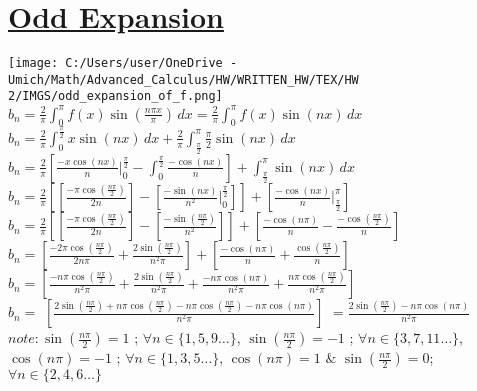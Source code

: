 \documentclass[a4paper,man,natbib]{apa6}
\begin{document}
\section{\underline{Odd Expansion}}
\label{sec: Odd Expansion}
\begin{center} 

    \texttt{[image: C:/Users/user/OneDrive - Umich/Math/Advanced\_Calculus/HW/WRITTEN\_HW/TEX/HW 2/IMGS/odd\_expansion\_of\_f.png]} \\
   
    \hfill \break
    $ b_n = \frac{2}{\pi}  \int_{0}^{\pi} f(x) \sin(\frac{n\pi x}{\pi}) \,dx  =
    \frac{2}{\pi}  \int_{0}^{\pi} f(x) \sin(nx) \,dx $ \\ 
    $ b_n = \frac{2}{\pi}  \int_{0}^{\frac{\pi}{2}} x \sin(nx) \,dx + \frac{2}{\pi}  \int_{\frac{\pi}{2}}^{\pi} \frac{\pi}{2} \sin(nx) \,dx $ \\
    $ b_n = \frac{2}{\pi} [\frac{-x\cos(nx)}{n} \Big|_{0}^{\frac{\pi}{2}} - \int_{0}^{\frac{\pi}{2}} \frac{-\cos(nx)}{n}] + \int_{\frac{\pi}{2}}^{\pi} \sin(nx) \,dx $ \\
    $ b_n = \frac{2}{\pi} [[\frac{-\pi\cos(\frac{n\pi}{2})}{2n}] - [\frac{-\sin(nx)}{n^2} \Big|_{0}^{\frac{\pi}{2}}]] + [\frac{-\cos(nx)}{n} \Big|_{\frac{\pi}{2}}^{\pi}] $ \\
    $ b_n = \frac{2}{\pi} [[\frac{-\pi\cos(\frac{n\pi}{2})}{2n}] - [\frac{-\sin(\frac{n\pi}{2})}{n^2}]] + [\frac{-\cos(n\pi)}{n} - \frac{-\cos(\frac{n\pi}{2})}{n}] $ \\
    
 $ b_n = [\frac{-2\pi\cos(\frac{n\pi}{2})}{2n\pi} + \frac{2\sin(\frac{n\pi}{2})}{n^2\pi}] + [\frac{-\cos(n\pi)}{n} + \frac{\cos(\frac{n\pi}{2})}{n}] $ 
    $ b_n = [\frac{-n\pi\cos(\frac{n\pi}{2})}{n^2\pi} + \frac{2\sin(\frac{n\pi}{2})}{n^2\pi} + \frac{-n\pi\cos(n\pi)}{n^2\pi} + \frac{n\pi\cos(\frac{n\pi}{2})}{n^2\pi}] $ \\
    \color{red} $ b_n = $ \color{black} $ [\frac{2\sin(\frac{n\pi}{2}) + n\pi\cos(\frac{n\pi}{2}) - n\pi\cos(\frac{n\pi}{2}) - n\pi\cos(n\pi)}{n^2\pi}] $ \color{red} $ = \frac{2\sin(\frac{n\pi}{2}) - n\pi\cos(n\pi)}{n^2\pi} $ \color{black} \\

    
    $ note: \sin(\frac{n\pi}{2}) = 1 $ ; $ \forall n \in \{1, 5, 9 \dots \} $, $ \sin(\frac{n\pi}{2}) = -1 $ ; $ \forall n \in \{3, 7, 11 \dots \} $, \\
    $ \cos(n\pi) = -1 $ ; $ \forall n \in \{1, 3, 5 \dots \} $, $ \cos(n\pi) = 1 $ $\&$ $ \sin(\frac{n\pi}{2}) = 0 $; $ \forall n \in \{2, 4, 6 \dots \} $ \\
    

\end{center}
\end{document}
